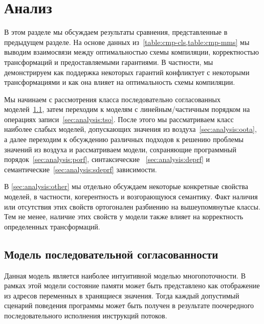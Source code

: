 \section{Анализ}
\label{sec:analysis}


В этом разделе мы обсуждаем результаты сравнения, представленные в предыдущем разделе.
На основе данных из~\cref{table:cmp-cls,table:cmp-mms} 
мы выводим взаимосвязи между оптимальностью схемы компиляции,
корректностью трансформаций и предоставляемыми гарантиями. 
В частности, мы демонстрируем как поддержка 
некоторых гарантий конфликтует с некоторыми трансформациями 
и как она влияет на оптимальность схемы компиляции. 

Мы начинаем с рассмотрения класса 
последовательно согласованных моделей~\cref{sec:analysis:seqcst},
затем  переходим к моделям с линейным/частичным порядком на операциях записи~\cref{sec:analysis:tso}.
После этого мы рассматриваем класс наиболее слабых моделей, 
допускающих значения из воздуха~\cref{sec:analysis:oota}, 
а далее переходим к обсуждению различных подходов 
к решению проблемы значений из воздуха и рассматриваем модели, 
сохраняющие программный порядок~\cref{sec:analysis:porf},
синтаксические ~\cref{sec:analysis:deprf} и
семантические~\cref{sec:analysis:sdeprf} зависимости.
 
В \cref{sec:analysis:other} мы отдельно обсуждаем некоторые 
конкретные свойства моделей, в частности, когерентность и возгорающуюся семантику. 
Факт наличия или отсутствия этих свойств ортогонален
разбиению на вышеупомянутые классы. 
Тем не менее, наличие этих свойств у модели также влияет 
на корректность определенных трансформаций.

\subsection{Модель последовательной согласованности}
\label{sec:analysis:seqcst}

Данная модель является наиболее интуитивной моделью многопоточности.
В рамках этой модели состояние памяти может быть 
представлено как отображение из 
адресов переменных в хранящиеся значения. 
Тогда каждый допустимый сценарий поведения программы 
может быть получен в результате поочередного последовательного
исполнения инструкций потоков. 

